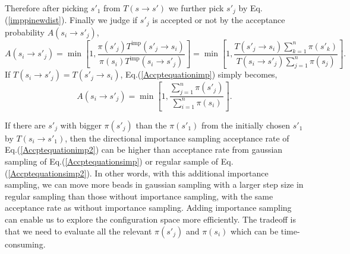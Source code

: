 \documentclass[12pt,letterpaper,UTF8]{report}
\begin{document}
Therefore after picking $s'_1$ from $T(s\rightarrow s')$ we further pick $s'_j$ by Eq.(\ref{imppinewdist}).
Finally we judge if $s'_j$ is accepted or not by the acceptance probability $A(s_i\rightarrow s'_j)$,
\begin{equation}
\!\!\!\!\!\!\!\!
A(s_i \rightarrow s'_j)=
\min \left[  1, \frac{\pi(s'_j)T^{\textrm{imp}}(s'_j\rightarrow s_i)}{\pi(s_i) T^{\textrm{imp}}(s_i \rightarrow s'_j)} \right]
=  \min \left[  1, \frac{ T(s'_j\rightarrow s_i) \sum \limits_{k=1}^n \pi(s'_k)  }{ T(s_i\rightarrow s'_j) \sum \limits_{j=1}^n \pi(s_j)  } \right] .
\label{Accptequationimp}
\end{equation}
If $T(s_i\rightarrow s'_j) =T(s'_j\rightarrow s_i)  $, Eq.(\ref{Accptequationimp}) simply becomes,
\begin{equation}
A(s_i\rightarrow s'_j)
=  \min \left[  1, \frac{\sum_{j=1}^n \pi(s'_j)}{\sum_{i=1}^n \pi(s_i)} \right] .
\label{Accptequationimp2}
\end{equation}

If there are $s'_j$ with bigger $\pi(s'_j)$ than the $\pi(s'_1)$ from the initially chosen $s'_1$  by $T(s_i\rightarrow s'_1)$, then the directional importance sampling acceptance rate of Eq.(\ref{Accptequationimp2}) can be higher than acceptance rate from gaussian sampling of Eq.(\ref{Accptequationsimp}) or regular sample of Eq.(\ref{Accptequationsimp2}).
In other words, with this additional importance sampling, we can move more beads in gaussian sampling with a larger step size in regular sampling than those without importance sampling, with the same acceptance rate as without importance sampling.
Adding importance sampling can enable us to explore the configuration space more efficiently.
The tradeoff is that we need to evaluate all the relevant $\pi(s'_j)$ and  $\pi(s_i)$ which can be time-consuming.
\end{document}
